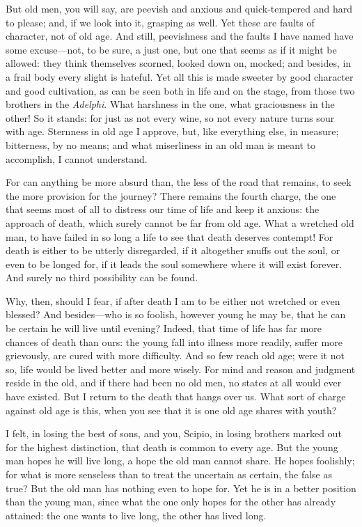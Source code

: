  But old men, you will say, are peevish and anxious and quick-tempered and hard to please; and, if we look into it, grasping as well. Yet these are faults of character, not of old age. And still, peevishness and the faults I have named have some excuse—not, to be sure, a just one, but one that seems as if it might be allowed: they think themselves scorned, looked down on, mocked; and besides, in a frail body every slight is hateful. Yet all this is made sweeter by good character and good cultivation, as can be seen both in life and on the stage, from those two brothers in the \textit{Adelphi}. What harshness in the one, what graciousness in the other! So it stands: for just as not every wine, so not every nature turns sour with age. Sternness in old age I approve, but, like everything else, in measure; bitterness, by no means; and what miserliness in an old man is meant to accomplish, I cannot understand.

 For can anything be more absurd than, the less of the road that remains, to seek the more provision for the journey? There remains the fourth charge, the one that seems most of all to distress our time of life and keep it anxious: the approach of death, which surely cannot be far from old age. What a wretched old man, to have failed in so long a life to see that death deserves contempt! For death is either to be utterly disregarded, if it altogether snuffs out the soul, or even to be longed for, if it leads the soul somewhere where it will exist forever. And surely no third possibility can be found.

 Why, then, should I fear, if after death I am to be either not wretched or even blessed? And besides—who is so foolish, however young he may be, that he can be certain he will live until evening? Indeed, that time of life has far more chances of death than ours: the young fall into illness more readily, suffer more grievously, are cured with more difficulty. And so few reach old age; were it not so, life would be lived better and more wisely. For mind and reason and judgment reside in the old, and if there had been no old men, no states at all would ever have existed. But I return to the death that hangs over us. What sort of charge against old age is this, when you see that it is one old age shares with youth?

 I felt, in losing the best of sons, and you, Scipio, in losing brothers marked out for the highest distinction, that death is common to every age. But the young man hopes he will live long, a hope the old man cannot share. He hopes foolishly; for what is more senseless than to treat the uncertain as certain, the false as true? But the old man has nothing even to hope for. Yet he is in a better position than the young man, since what the one only hopes for the other has already attained: the one wants to live long, the other has lived long.


